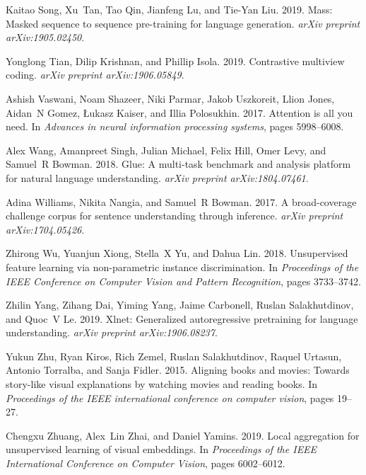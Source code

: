 \documentclass[11pt,a4paper]{article}
\begin{document}
\begin{thebibliography}{32}
Kaitao Song, Xu~Tan, Tao Qin, Jianfeng Lu, and Tie-Yan Liu. 2019.
\newblock Mass: Masked sequence to sequence pre-training for language
  generation.
\newblock \emph{arXiv preprint arXiv:1905.02450}.

Yonglong Tian, Dilip Krishnan, and Phillip Isola. 2019.
\newblock Contrastive multiview coding.
\newblock \emph{arXiv preprint arXiv:1906.05849}.

Ashish Vaswani, Noam Shazeer, Niki Parmar, Jakob Uszkoreit, Llion Jones,
  Aidan~N Gomez, {\L}ukasz Kaiser, and Illia Polosukhin. 2017.
\newblock Attention is all you need.
\newblock In \emph{Advances in neural information processing systems}, pages
  5998--6008.

Alex Wang, Amanpreet Singh, Julian Michael, Felix Hill, Omer Levy, and Samuel~R
  Bowman. 2018.
\newblock Glue: A multi-task benchmark and analysis platform for natural
  language understanding.
\newblock \emph{arXiv preprint arXiv:1804.07461}.

Adina Williams, Nikita Nangia, and Samuel~R Bowman. 2017.
\newblock A broad-coverage challenge corpus for sentence understanding through
  inference.
\newblock \emph{arXiv preprint arXiv:1704.05426}.

Zhirong Wu, Yuanjun Xiong, Stella~X Yu, and Dahua Lin. 2018.
\newblock Unsupervised feature learning via non-parametric instance
  discrimination.
\newblock In \emph{Proceedings of the IEEE Conference on Computer Vision and
  Pattern Recognition}, pages 3733--3742.

Zhilin Yang, Zihang Dai, Yiming Yang, Jaime Carbonell, Ruslan Salakhutdinov,
  and Quoc~V Le. 2019.
\newblock Xlnet: Generalized autoregressive pretraining for language
  understanding.
\newblock \emph{arXiv preprint arXiv:1906.08237}.

Yukun Zhu, Ryan Kiros, Rich Zemel, Ruslan Salakhutdinov, Raquel Urtasun,
  Antonio Torralba, and Sanja Fidler. 2015.
\newblock Aligning books and movies: Towards story-like visual explanations by
  watching movies and reading books.
\newblock In \emph{Proceedings of the IEEE international conference on computer
  vision}, pages 19--27.

Chengxu Zhuang, Alex~Lin Zhai, and Daniel Yamins. 2019.
\newblock Local aggregation for unsupervised learning of visual embeddings.
\newblock In \emph{Proceedings of the IEEE International Conference on Computer
  Vision}, pages 6002--6012.

\end{thebibliography}
 

\end{document}
